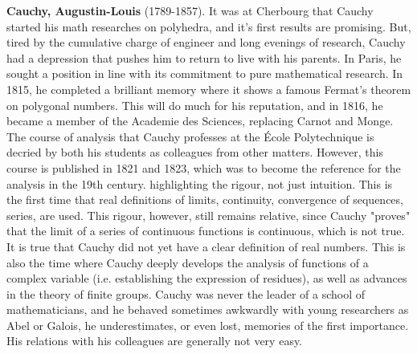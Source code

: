 \textbf{Cauchy, Augustin-Louis} (1789-1857). It was at Cherbourg that Cauchy started his math researches on polyhedra, and it's first results are promising. But, tired by the cumulative charge of engineer and long evenings of research, Cauchy had a depression that pushes him to return to live with his parents. In Paris, he sought a position in line with its commitment to pure mathematical research. In 1815, he completed a brilliant memory where it shows a famous Fermat's theorem on polygonal numbers. This will do much for his reputation, and in 1816, he became a member of the Academie des Sciences, replacing Carnot and Monge. The course of analysis that Cauchy professes at the École Polytechnique is decried by both his students as colleagues from other matters. However, this course is published in 1821 and 1823, which was to become the reference for the analysis in the 19th century. highlighting the rigour, not just intuition. This is the first time that real definitions of limits, continuity, convergence of sequences, series, are used. This rigour, however, still remains relative, since Cauchy "proves" that the limit of a series of continuous functions is continuous, which is not true. It is true that Cauchy did not yet have a clear definition of real numbers. This is also the time where Cauchy deeply develops the analysis of functions of a complex variable (i.e. establishing the expression of residues), as well as advances in the theory of finite groups. Cauchy was never the leader of a school of mathematicians, and he behaved sometimes awkwardly with young researchers as Abel or Galois, he underestimates, or even lost, memories of the first importance. His relations with his colleagues are generally not very easy.

